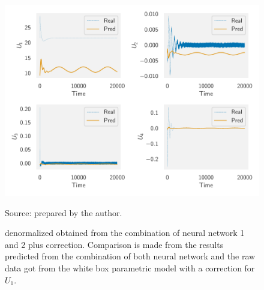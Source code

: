 \begin{figure}[!htb]
    \centering
    \caption[Forces denormalized obtained from the combination of neural network 1 and 2 plus correction]{ denormalized obtained from the combination of neural network 1 and 2 plus correction. Comparison is made from the results predicted from the combination of both neural network and the raw data got from the white box parametric model with a correction for \(U_1\).}
    \includegraphics{figures/4results/uav/forces_denormalized_correction.pdf}

    {\footnotesize Source: prepared by the author.}
    \label{fig:forces_denormalized_correction}
\end{figure}


